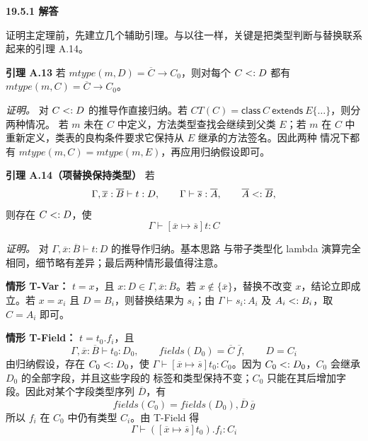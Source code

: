 \begin{taplauthorsolutionentrybox}
\label{sol:author:19.5.1}
\textbf{19.5.1 解答}

证明主定理前，先建立几个辅助引理。与以往一样，关键是把类型判断与替换联系
起来的引理 A.14。


\medskip
\textbf{引理 A.13}
若
\(\mathit{mtype}(m,D)=\overline C\to C_0\)，则对每个
\(C\mathrel{<:} D\) 都有
\(\mathit{mtype}(m,C)=\overline C\to C_0\)。

\textit{证明。}
对 \(C\mathrel{<:} D\) 的推导作直接归纳。若
\(CT(C)=\mathsf{class}\ C\ \mathsf{extends}\ E\{\ldots\}\)，则分两种情况。
若 \(m\) 未在 \(C\) 中定义，方法类型查找会继续到父类 \(E\)；若 \(m\) 在
\(C\) 中重新定义，类表的良构条件要求它保持从 \(E\) 继承的方法签名。因此两种
情况下都有 \(\mathit{mtype}(m,C)=\mathit{mtype}(m,E)\)，再应用归纳假设即可。

\medskip
\textbf{引理 A.14（项替换保持类型）}
若
\[
 \Gamma,\overline x:\overline B\vdash t:D,
 \qquad
 \Gamma\vdash\overline s:\overline A,
 \qquad
 \overline A\mathrel{<:}\overline B,
\]
则存在 \(C\mathrel{<:} D\)，使
\[
 \Gamma\vdash[\overline x\mapsto\overline s]t:C
\]

\textit{证明。}
对 \(\Gamma,\overline x:\overline B\vdash t:D\) 的推导作归纳。基本思路
与带子类型化 lambda 演算完全相同，细节略有差异；最后两种情形最值得注意。

\textbf{情形 T-Var：}
\(t=x\)，且 \(x:D\in\Gamma,\overline x:\overline B\)。若
\(x\notin\{\overline x\}\)，替换不改变 \(x\)，结论立即成立。若
\(x=x_i\) 且 \(D=B_i\)，则替换结果为 \(s_i\)；由
\(\Gamma\vdash s_i:A_i\) 及 \(A_i\mathrel{<:} B_i\)，取 \(C=A_i\) 即可。

\textbf{情形 T-Field：}
\(t=t_0.f_i\)，且
\[
 \Gamma,\overline x:\overline B\vdash t_0:D_0,
 \qquad
 \mathit{fields}(D_0)=\overline C\ \overline f,
 \qquad D=C_i
\]
由归纳假设，存在 \(C_0\mathrel{<:} D_0\)，使
\(\Gamma\vdash[\overline x\mapsto\overline s]t_0:C_0\)。因为
\(C_0\mathrel{<:} D_0\)，\(C_0\) 会继承 \(D_0\) 的全部字段，并且这些字段的
标签和类型保持不变；\(C_0\) 只能在其后增加字段。因此对某个字段类型序列
\(\overline D\)，有
\[
 \mathit{fields}(C_0)=
 \mathit{fields}(D_0),\overline D\ \overline g
\]
所以 \(f_i\) 在 \(C_0\) 中仍有类型 \(C_i\)。由 T-Field 得
\[
 \Gamma\vdash
 ([\overline x\mapsto\overline s]t_0).f_i:C_i
\]


\end{taplauthorsolutionentrybox}
